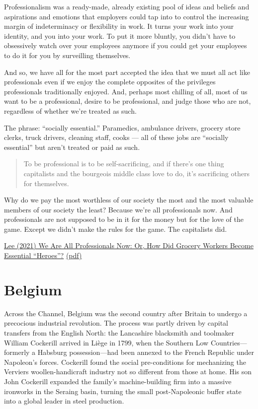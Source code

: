 \documentclass[
]{book}
\begin{document}
Professionalism was a
ready-made, already existing pool of ideas and beliefs and
aspirations and emotions that employers could tap into to
control the increasing margin of indeterminacy or flexibility in work.
It turns your
work into your identity, and you into your work.
To put it
more bluntly, you didn't have to obsessively watch over your
employees anymore if you could get your employees to do it
for you by surveilling themselves.

And so, we have all for the most part
accepted the idea that we must all act like professionals even
if we enjoy the complete opposites of the privileges
professionals traditionally enjoyed. And, perhaps most
chilling of all, most of us want to be a professional, desire to
be professional, and judge those who are not, regardless of
whether we're treated as such.

The phrase: ``socially essential.'' Paramedics,
ambulance drivers, grocery store clerks, truck drivers,
cleaning staff, cooks --- all of these jobs are ``socially
essential'' but aren't treated or paid as such.

\begin{quote}
To be professional is to be
self-sacrificing, and if there's one thing capitalists and the
bourgeois middle class love to do, it's sacrificing others for
themselves.
\end{quote}

Why do we pay the most worthless of our society the most and the most valuable members of our society the least?
Because we're all professionals now. And professionals are not supposed to be in it for the money but for the love of the game.
Except we didn't make the rules for the game.
The capitalists did.

\href{https://medium.com/@teioh/we-are-all-professionals-now-or-how-did-grocery-workers-become-heroes-4cba3ffcc034}{Lee (2021) We Are All Professionals Now: Or, How Did Grocery Workers Become Essential ``Heroes''?}
\href{pdf/Lee_Professionalism.pdf}{(pdf)}

\hypertarget{belgium}{%
\chapter{Belgium}\label{belgium}}

Across the Channel, Belgium was the second country after Britain to undergo a precocious industrial revolution. The process was partly driven by capital transfers from the English North: the Lancashire blacksmith and toolmaker William Cockerill arrived in Liège in 1799, when the Southern Low Countries---formerly a Habsburg possession---had been annexed to the French Republic under Napoleon's forces. Cockerill found the social pre-conditions for mechanizing the Verviers woollen-handicraft industry not so different from those at home. His son John Cockerill expanded the family's machine-building firm into a massive ironworks in the Seraing basin, turning the small post-Napoleonic buffer state into a global leader in steel production.
\end{document}

